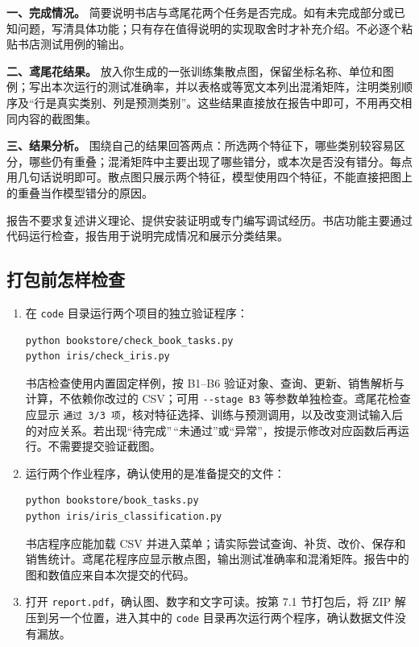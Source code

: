 \documentclass[UTF8,a4paper,11pt,fontset=fandol]{ctexart}
\providecommand{\passthrough}[1]{#1}
\begin{document}
\textbf{一、完成情况。} 简要说明书店与鸢尾花两个任务是否完成。如有未完成部分或已知问题，写清具体功能；只有存在值得说明的实现取舍时才补充介绍。不必逐个粘贴书店测试用例的输出。

\textbf{二、鸢尾花结果。} 放入你生成的一张训练集散点图，保留坐标名称、单位和图例；写出本次运行的测试准确率，并以表格或等宽文本列出混淆矩阵，注明类别顺序及``行是真实类别、列是预测类别''。这些结果直接放在报告中即可，不用再交相同内容的截图集。

\textbf{三、结果分析。} 围绕自己的结果回答两点：所选两个特征下，哪些类别较容易区分，哪些仍有重叠；混淆矩阵中主要出现了哪些错分，或本次是否没有错分。每点用几句话说明即可。散点图只展示两个特征，模型使用四个特征，不能直接把图上的重叠当作模型错分的原因。

报告不要求复述讲义理论、提供安装证明或专门编写调试经历。书店功能主要通过代码运行检查，报告用于说明完成情况和展示分类结果。

\clearpage

\subsection{打包前怎样检查}\label{ux6253ux5305ux524dux600eux6837ux68c0ux67e5}

\begin{enumerate}
\def\labelenumi{\arabic{enumi}.}
\item
  在 \passthrough{\lstinline!code!} 目录运行两个项目的独立验证程序：

\begin{lstlisting}[language={}]
python bookstore/check_book_tasks.py
python iris/check_iris.py
\end{lstlisting}

  书店检查使用内置固定样例，按 B1--B6 验证对象、查询、更新、销售解析与计算，不依赖你改过的 CSV；可用 \passthrough{\lstinline!--stage B3!} 等参数单独检查。鸢尾花检查应显示 \passthrough{\lstinline!通过 3/3 项!}，核对特征选择、训练与预测调用，以及改变测试输入后的对应关系。若出现``待完成''\,``未通过''或``异常''，按提示修改对应函数后再运行。不需要提交验证截图。
\item
  运行两个作业程序，确认使用的是准备提交的文件：

\begin{lstlisting}[language={}]
python bookstore/book_tasks.py
python iris/iris_classification.py
\end{lstlisting}

  书店程序应能加载 CSV 并进入菜单；请实际尝试查询、补货、改价、保存和销售统计。鸢尾花程序应显示散点图，输出测试准确率和混淆矩阵。报告中的图和数值应来自本次提交的代码。
\item
  打开 \passthrough{\lstinline!report.pdf!}，确认图、数字和文字可读。按第 7.1 节打包后，将 ZIP 解压到另一个位置，进入其中的 \passthrough{\lstinline!code!} 目录再次运行两个程序，确认数据文件没有漏放。
\end{enumerate}
\end{document}
